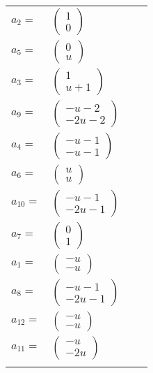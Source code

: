 \documentclass[1p]{elsarticle_modified}
\theoremstyle{definition}
\begin{document}
\begin{tabular}{m{7pt} m{180pt} m{7pt} m{180pt} }
\flushright $a_{2}=$&$\begin{pmatrix}1\\0\end{pmatrix}$ \\
\flushright $a_{5}=$&$\begin{pmatrix}0\\u\end{pmatrix}$ \\
\flushright $a_{3}=$&$\begin{pmatrix}1\\u+1\end{pmatrix}$ \\
\flushright $a_{9}=$&$\begin{pmatrix}- u-2\\-2 u-2\end{pmatrix}$ \\
\flushright $a_{4}=$&$\begin{pmatrix}- u-1\\- u-1\end{pmatrix}$ \\
\flushright $a_{6}=$&$\begin{pmatrix}u\\u\end{pmatrix}$ \\
\flushright $a_{10}=$&$\begin{pmatrix}- u-1\\-2 u-1\end{pmatrix}$ \\
\flushright $a_{7}=$&$\begin{pmatrix}0\\1\end{pmatrix}$ \\
\flushright $a_{1}=$&$\begin{pmatrix}- u\\- u\end{pmatrix}$ \\
\flushright $a_{8}=$&$\begin{pmatrix}- u-1\\-2 u-1\end{pmatrix}$ \\
\flushright $a_{12}=$&$\begin{pmatrix}- u\\- u\end{pmatrix}$ \\
\flushright $a_{11}=$&$\begin{pmatrix}- u\\-2 u\end{pmatrix}$\\&\end{tabular}
\end{document}
